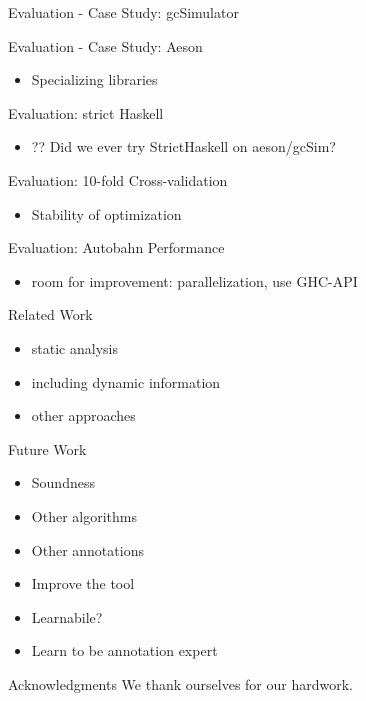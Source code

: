 \documentclass{beamer}
\begin{document}
\begin{frame}{Evaluation - Case Study: gcSimulator}
\end{frame}

\begin{frame}{Evaluation - Case Study: Aeson}
  \begin{itemize}
  \item Specializing libraries
  \end{itemize}
\end{frame}

\begin{frame}{Evaluation: strict Haskell}
  \begin{itemize}
  \item ?? Did we ever try StrictHaskell on aeson/gcSim?
  \end{itemize}
\end{frame}

\begin{frame}{Evaluation: 10-fold Cross-validation}
  \begin{itemize}
  \item Stability of optimization
  \end{itemize}
\end{frame}

\begin{frame}{Evaluation: Autobahn Performance}
  \begin{itemize}
  \item room for improvement: parallelization, use GHC-API
  \end{itemize}
\end{frame}

\begin{frame}{Related Work}
  \begin{itemize}
  \item static analysis
  \item including dynamic information
  \item other approaches
  \end{itemize}
\end{frame}

\begin{frame}{Future Work}
  \begin{itemize}
  \item Soundness
  \item Other algorithms
  \item Other annotations
  \item Improve the tool
  \item Learnabile?
  \item Learn to be annotation expert
  \end{itemize}
\end{frame}

\begin{frame}{Acknowledgments}
We thank ourselves for our hardwork. 
\end{frame}
\end{document}
